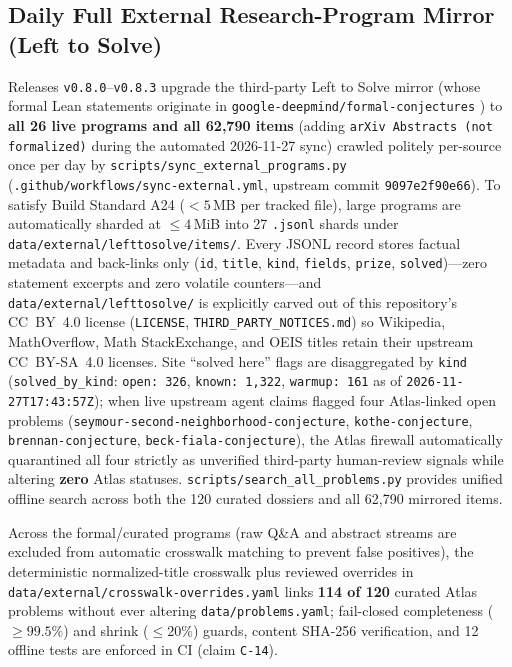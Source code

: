 \documentclass[11pt,reqno]{amsart}
\def\UrlBreaks{\do\.\do\/\do\-\do\_\do\:\do\=\do\,\do\{\do\}}
\theoremstyle{plain}
\theoremstyle{definition}
\newcommand{\code}[1]{{\upshape\nolinkurl{#1}}}
\newcommand{\hashcode}[1]{{\upshape\def\UrlBreaks{\do\:\do 0\do 1\do 2\do 3\do 4\do 5\do 6\do 7\do 8\do 9\do a\do b\do c\do d\do e\do f\do h\do n\do p\do s\do w}\nolinkurl{#1}}}
\begin{document}
\subsection{Daily Full External Research-Program Mirror (Left to Solve)}\label{sec:external}
Releases \texttt{v0.8.0}--\texttt{v0.8.3} upgrade the third-party Left to Solve \cite{lefttosolve2026}
mirror (whose formal Lean statements originate in \code{google-deepmind/formal-conjectures}
\cite{formalconjectures2025}) to \textbf{all 26 live programs and all 62,790 items} (adding
\code{arXiv Abstracts (not formalized)} during the automated 2026-11-27 sync) crawled politely
per-source once per day by \code{scripts/sync_external_programs.py}
(\code{.github/workflows/sync-external.yml}, upstream commit \hashcode{9097e2f90e66}). To satisfy
Build Standard A24 ($<5$\,MB per tracked file), large programs are automatically sharded at
$\le 4$\,MiB into 27 \code{.jsonl} shards under \code{data/external/lefttosolve/items/}. Every
JSONL record stores factual metadata and back-links only (\code{id}, \code{title}, \code{kind},
\code{fields}, \code{prize}, \code{solved})---zero statement excerpts and zero volatile
counters---and \code{data/external/lefttosolve/} is explicitly carved out of this repository's
CC~BY~4.0 license (\code{LICENSE}, \code{THIRD_PARTY_NOTICES.md}) so Wikipedia, MathOverflow,
Math StackExchange, and OEIS titles retain their upstream CC~BY-SA~4.0 licenses. Site ``solved
here'' flags are disaggregated by \code{kind} (\code{solved_by_kind}: \code{open: 326},
\code{known: 1,322}, \code{warmup: 161} as of \code{2026-11-27T17:43:57Z}); when live upstream
agent claims flagged four Atlas-linked open problems (\code{seymour-second-neighborhood-conjecture},
\code{kothe-conjecture}, \code{brennan-conjecture}, \code{beck-fiala-conjecture}), the Atlas
firewall automatically quarantined all four strictly as unverified third-party human-review
signals while altering \textbf{zero} Atlas statuses. \code{scripts/search_all_problems.py}
provides unified offline search across both the 120 curated dossiers and all 62,790 mirrored items.

Across the formal/curated programs (raw Q\&A and abstract streams are excluded from automatic
crosswalk matching to prevent false positives), the deterministic normalized-title crosswalk plus
reviewed overrides in \code{data/external/crosswalk-overrides.yaml} links \textbf{114 of 120}
curated Atlas problems without ever altering \code{data/problems.yaml}; fail-closed completeness
($\ge 99.5\%$) and shrink ($\le 20\%$) guards, content SHA-256 verification, and 12 offline tests
are enforced in CI (claim \code{C-14}).
\end{document}
